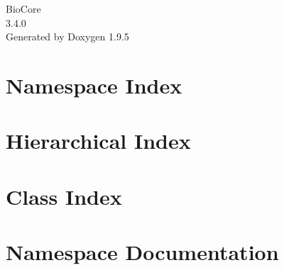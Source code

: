 \documentclass[twoside]{book}
\newcommand{\+}{\discretionary{\mbox{\scriptsize$\hookleftarrow$}}{}{}}
\newcommand{\clearemptydoublepage}{%
    \newpage{\pagestyle{empty}\cleardoublepage}%
  }
\begin{document}
  \raggedbottom
    \hypersetup{pageanchor=false,
                bookmarksnumbered=true,
                pdfencoding=unicode
               }
  \begin{titlepage}
  \vspace*{7cm}
  \begin{center}%
  {\Large Bio\+Core}\\
  [1ex]\large 3.\+4.\+0 \\
  \vspace*{1cm}
  {\large Generated by Doxygen 1.9.5}\\
  \end{center}
  \end{titlepage}
  \clearemptydoublepage
  \tableofcontents
  \clearemptydoublepage
  \hypersetup{pageanchor=true}
\chapter{Namespace Index}

\chapter{Hierarchical Index}

\chapter{Class Index}

\chapter{Namespace Documentation}



\end{document}
